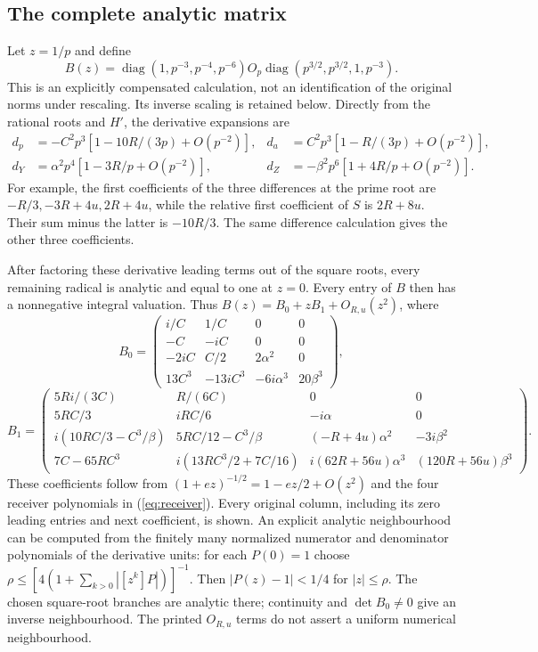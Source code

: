 \subsection{The complete analytic matrix}
Let $z=1/p$ and define
\[
 B(z)=\operatorname{diag}(1,p^{-3},p^{-4},p^{-6})O_p
       \operatorname{diag}(p^{3/2},p^{3/2},1,p^{-3}).
\]
This is an explicitly compensated calculation, not an identification of the
original norms under rescaling. Its inverse scaling is retained below.
Directly from the rational roots and $H'$, the derivative expansions are
\begin{align*}
 d_p&=-C^2p^3[1-10R/(3p)+O(p^{-2})],&
 d_a&= C^2p^3[1-R/(3p)+O(p^{-2})],\\
 d_Y&=\alpha^2p^4[1-3R/p+O(p^{-2})],&
 d_Z&=-\beta^2p^6[1+4R/p+O(p^{-2})].
\end{align*}
For example, the first coefficients of the three differences at the prime
root are $-R/3,-3R+4u,2R+4u$, while the relative first coefficient of $S$
is $2R+8u$. Their sum minus the latter is $-10R/3$.
The same difference calculation gives the other three coefficients.

After factoring these derivative leading terms out of the square roots,
every remaining radical is analytic and equal to one at $z=0$. Every
entry of $B$ then has a nonnegative integral valuation. Thus
$B(z)=B_0+zB_1+O_{R,u}(z^2)$, where
\[
B_0=\begin{pmatrix}
i/C&1/C&0&0\\
-C&-iC&0&0\\
-2iC&C/2&2\alpha^2&0\\
13C^3&-13iC^3&-6i\alpha^3&20\beta^3
\end{pmatrix},
\]
\[
B_1=\begin{pmatrix}
5Ri/(3C)&R/(6C)&0&0\\
5RC/3&iRC/6&-i\alpha&0\\
i(10RC/3-C^3/\beta)&5RC/12-C^3/\beta&(-R+4u)\alpha^2&-3i\beta^2\\
7C-65RC^3&i(13RC^3/2+7C/16)&i(62R+56u)\alpha^3&(120R+56u)\beta^3
\end{pmatrix}.
\]
These coefficients follow from $(1+ez)^{-1/2}=1-ez/2+O(z^2)$ and the four
receiver polynomials in (\ref{eq:receiver}). Every original column, including
its zero leading entries and next coefficient, is shown.
An explicit analytic neighbourhood can be computed from the finitely many
normalized numerator and denominator polynomials of the derivative units:
for each $P(0)=1$ choose $\rho\le[4(1+\sum_{k>0}|[z^k]P|)]^{-1}$.
Then $|P(z)-1|<1/4$ for $|z|\le\rho$. The chosen square-root branches are
analytic there; continuity and $\det B_0\ne0$ give an inverse neighbourhood.
The printed $O_{R,u}$ terms do not assert a uniform numerical neighbourhood.

